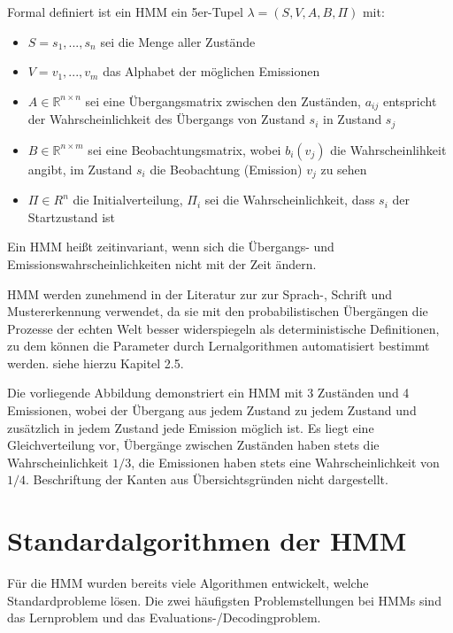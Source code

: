 Formal definiert ist ein HMM ein 5er-Tupel $\lambda= (S, V, A, B, \Pi)$ mit:

\begin{itemize}
 \item $S = {s_1,..., s_n}$ sei die Menge aller Zustände
 \item $V = {v_1,..., v_m}$ das Alphabet der möglichen Emissionen
 \item $A \in \mathbb{R}^{n \times n}$ sei eine Übergangsmatrix zwischen den Zuständen, $a_{ij}$ entspricht der Wahrscheinlichkeit des Übergangs von Zustand $s_i$ in Zustand $s_j$
 \item $B \in \mathbb{R}^{n\times m}$ sei eine Beobachtungsmatrix, wobei $b_i(v_j)$ die Wahrscheinlihkeit angibt, im Zustand $s_i$ die Beobachtung (Emission) $v_j$ zu sehen
 \item $\Pi \in R^n$ die Initialverteilung, $\Pi_i$ sei die Wahrscheinlichkeit, dass $s_i$ der Startzustand ist
\end{itemize}

Ein HMM heißt zeitinvariant, wenn sich die Übergangs- und Emissionswahrscheinlichkeiten nicht mit der Zeit ändern.

HMM werden zunehmend in der Literatur zur zur Sprach-, Schrift und Mustererkennung verwendet, da sie mit den probabilistischen Übergängen die Prozesse der echten Welt besser widerspiegeln als deterministische Definitionen, zu dem können die Parameter durch Lernalgorithmen automatisiert bestimmt werden.
 siehe hierzu Kapitel 2.5.




Die vorliegende Abbildung demonstriert ein HMM mit 3 Zuständen und 4 Emissionen, wobei der Übergang aus jedem Zustand zu jedem Zustand und zusätzlich in jedem Zustand jede Emission möglich ist.
Es liegt eine Gleichverteilung vor, Übergänge zwischen Zuständen haben stets die Wahrscheinlichkeit $1/3$, die Emissionen haben stets eine Wahrscheinlichkeit von $1/4$.
 Beschriftung der Kanten aus Übersichtsgründen nicht dargestellt.


\section{Standardalgorithmen der HMM}

Für die HMM wurden bereits viele Algorithmen entwickelt, welche Standardprobleme lösen.
 Die zwei häufigsten Problemstellungen bei HMMs sind das Lernproblem und das Evaluations-/Decodingproblem.

